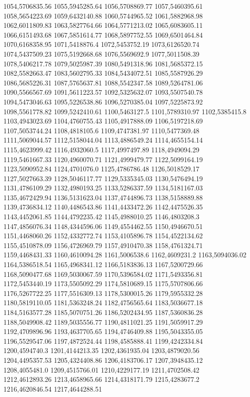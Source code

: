 1054,5706835.56
1055,5945285.64
1056,5708869.77
1057,5460395.61
1058,5654223.69
1059,6432140.88
1060,5744965.52
1061,5882968.98
1062,6011809.83
1063,5827764.66
1064,5771213.02
1065,6083605.11
1066,6151493.68
1067,5851614.77
1068,5897752.55
1069,6501464.84
1070,6168358.95
1071,5418876.4
1072,5453752.19
1073,6126520.74
1074,5437509.23
1075,5192668.68
1076,5569692.9
1077,5011508.39
1078,5406217.78
1079,5025987.39
1080,5491318.96
1081,5685372.15
1082,5582663.47
1083,5602795.33
1084,5434072.51
1085,5587926.29
1086,5685226.31
1087,5765637.81
1088,5542347.58
1089,5264781.06
1090,5566567.69
1091,5611223.57
1092,5325632.07
1093,5507540.78
1094,5473046.63
1095,5226538.86
1096,5270385.04
1097,5225873.92
1098,5561778.82
1099,5242410.61
1100,5463127.5
1101,5789310.97
1102,5385415.8
1103,4943023.69
1104,4760755.43
1105,4917888.09
1106,5197218.69
1107,5053744.24
1108,4818105.6
1109,4747381.97
1110,5477369.48
1111,5069044.57
1112,5158044.04
1113,4886549.24
1114,4655154.14
1115,4623999.42
1116,4932060.5
1117,4997497.89
1118,4949094.29
1119,5461667.33
1120,4960070.71
1121,4999479.77
1122,5099164.19
1123,5090952.84
1124,4701076.0
1125,4786786.48
1126,5018529.17
1127,5027663.39
1128,5046117.77
1129,5335345.03
1130,5476494.19
1131,4786109.29
1132,4980193.25
1133,5286337.59
1134,5181167.03
1135,4672429.94
1136,5131623.04
1137,4744896.73
1138,5158889.88
1139,4736834.12
1140,4486543.86
1141,4433472.26
1142,4475526.35
1143,4452061.85
1144,4792235.42
1145,4988010.25
1146,4803208.3
1147,4856076.34
1148,4344596.06
1149,4554462.55
1150,4946670.51
1151,4468060.26
1152,4332772.74
1153,4105896.78
1154,4522134.62
1155,4510878.09
1156,4726969.79
1157,4910470.38
1158,4761324.71
1159,4468431.33
1160,4610094.28
1161,5006538.6
1162,4609231.2
1163,5094036.02
1164,5386518.54
1165,4968341.12
1166,5183836.13
1167,5200729.66
1168,5090477.68
1169,5030067.59
1170,5396584.02
1171,5493356.81
1172,5453440.19
1173,5505092.29
1174,5810689.15
1175,5707806.66
1176,5267722.25
1177,5516309.13
1178,5300015.26
1179,5955332.28
1180,5819110.05
1181,5363248.24
1182,4756565.64
1183,5036677.18
1184,5163577.28
1185,5070751.26
1186,5202434.95
1187,5360836.28
1188,5049908.42
1189,5035556.77
1190,4811021.25
1191,5059917.29
1192,4709896.96
1193,4637705.65
1194,4746409.88
1195,5043355.05
1196,5529547.06
1197,4872524.44
1198,4585888.41
1199,4242334.84
1200,4594740.3
1201,4144213.35
1202,4361935.04
1203,4879020.56
1204,4495357.53
1205,4324408.86
1206,4183706.17
1207,3948435.12
1208,4055481.0
1209,4515766.01
1210,4229177.19
1211,4702508.42
1212,4612893.26
1213,4658965.66
1214,4318171.79
1215,4283677.2
1216,4620846.54
1217,4644288.51
